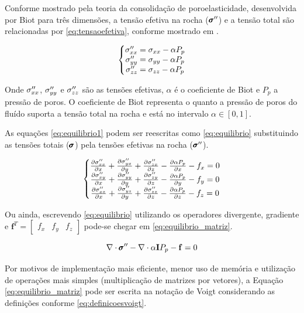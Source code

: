 Conforme mostrado pela teoria da consolidação de poroelasticidade, desenvolvida por Biot para três dimensões, a tensão efetiva na rocha ($\pmb{\sigma}^{\prime\prime}$) e a tensão total são relacionadas por \eqref{eq:tensaoefetiva}, conforme mostrado em \citet{ResGeomec}.


\begin{equation}
\label{eq:tensaoefetiva}
\left\{\begin{matrix}
 \sxx = \stxx - \alpha P_p \\
 \syy = \styy - \alpha P_p \\
 \szz = \stzz - \alpha P_p
\end{matrix}\right.
\end{equation}


Onde $\sigma^{\prime\prime}_{xx}$, $\sigma^{\prime\prime}_{yy}$  e $\sigma^{\prime\prime}_{zz}$ são as tensões efetivas, $\alpha$ é o coeficiente de Biot e $P_p$ a pressão de poros. O coeficiente de Biot representa o quanto a pressão de poros do fluído suporta a tensão total na rocha e está no intervalo $\alpha \in [0,1]$.

As equações \eqref{eq:equilibrio1} podem ser reescritas como \eqref{eq:equilibrio} substituindo as tensões totais ($\pmb{\sigma}$) pela tensões efetivas na rocha ($\pmb{\sigma}^{\prime\prime}$).

\begin{equation}
\label{eq:equilibrio}
\left\{\begin{matrix}
\dx[\sxx]  + \dy[\syx] + \dz[\szx] - \dx[\alpha P_p] - f_x   = 0
\\
\dx[\sxy]  + \dy[\syy] + \dz[\szy] - \dy[\alpha P_p] - f_y   = 0
\\
\dx[\sxz]  + \dy[\syz] + \dz[\szz] - \dz[\alpha P_p] - f_z   = 0
\end{matrix}\right.
\end{equation}

Ou ainda, escrevendo \eqref{eq:equilibrio} utilizando os operadores divergente, gradiente e $\mathbf{f}^T=\begin{bmatrix}f_x & f_y & f_z\end{bmatrix}$ pode-se chegar em
\eqref{eq:equilibrio_matriz}.

\begin{equation}
\label{eq:equilibrio_matriz}
\nabla \cdot \stef - \nabla \cdot \alpha \mathbf{I} P_p - \mathbf{f} = 0
\end{equation}

Por motivos de implementação mais eficiente, menor uso de memória e utilização de operações mais simples (multiplicação de matrizes por vetores), a Equação \eqref{eq:equilibrio_matriz} pode ser escrita na notação de Voigt considerando as definições conforme \eqref{eq:definicoesvoigt}.

